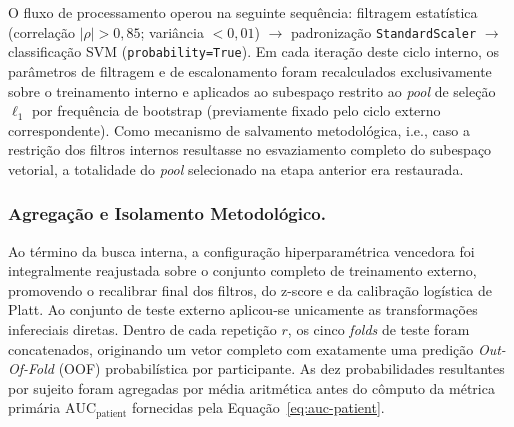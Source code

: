 \documentclass[review]{elsarticle}
\newcommand{\code}[1]{\texttt{#1}}
\begin{document}
O fluxo de processamento operou na seguinte sequência: filtragem estatística  (correlação $|\rho|>0{,}85$; variância $<0{,}01$) $\to$ padronização \code{StandardScaler} $\to$ classificação SVM (\code{probability=True}). Em cada iteração deste ciclo interno, os parâmetros de filtragem e de escalonamento foram recalculados exclusivamente sobre o treinamento interno e aplicados ao subespaço restrito ao \emph{pool} de seleção $\ell_1$ por frequência de bootstrap (previamente fixado pelo ciclo externo correspondente). Como mecanismo de salvamento metodológica, i.e., caso a restrição dos filtros internos resultasse no esvaziamento completo do subespaço vetorial, a totalidade do \emph{pool} selecionado na etapa anterior era restaurada.

\subsubsection{Agregação e Isolamento Metodológico.} 
Ao término da busca interna, a configuração hiperparamétrica vencedora foi integralmente reajustada sobre o conjunto completo de treinamento externo, promovendo o recalibrar final dos filtros, do z-score e da calibração logística de Platt. Ao conjunto de teste externo aplicou-se unicamente as transformações infereciais diretas. Dentro de cada repetição $r$, os cinco \emph{folds} de teste foram concatenados, originando um vetor completo com exatamente uma predição \emph{Out-Of-Fold} (OOF) probabilística por participante. As dez probabilidades resultantes por sujeito foram agregadas por média aritmética antes do cômputo da métrica primária $\mathrm{AUC}_{\mathrm{patient}}$ fornecidas pela Equação~\ref{eq:auc-patient}. 
\end{document}
